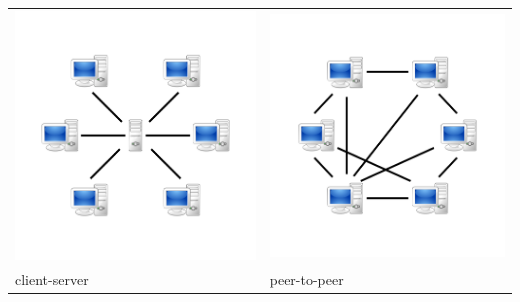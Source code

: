 \documentclass{beamer}
\begin{document}
\begin{frame}
	\centering
	\begin{tabular}{ll}
		\includegraphics[scale=0.05]{centralized} \hspace{0.5in} &
		\includegraphics[scale=0.05]{decentralized} \\
		client-server & peer-to-peer
	\end{tabular}
\end{frame}
\end{document}
